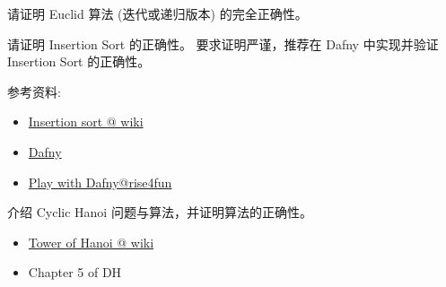 \documentclass[a4paper, justified]{tufte-handout}
\begin{document}
\begin{solution}
\end{solution}

\beginoptional

\begin{problem}
  请证明 Euclid 算法 (迭代或递归版本) 的完全正确性。
\end{problem}

\begin{solution}
\end{solution}

\beginot

\begin{ot}
  请证明 Insertion Sort 的正确性。
  要求证明严谨，推荐在 Dafny 中实现并验证 Insertion Sort 的正确性。

  参考资料:
  \begin{itemize}
    \item \href{https://en.wikipedia.org/wiki/Insertion\_sort}{Insertion sort @ wiki}
    \item \href{https://www.microsoft.com/en-us/research/project/dafny-a-language-and-program-verifier-for-functional-correctness/}{Dafny}
    \item \href{https://rise4fun.com/Dafny}{Play with Dafny@rise4fun}
  \end{itemize}
\end{ot}

\vspace{0.50cm}
\begin{ot}
  介绍 Cyclic Hanoi 问题与算法，并证明算法的正确性。

  \begin{itemize}
    \item \href{https://en.wikipedia.org/wiki/Tower\_of\_Hanoi}{Tower of Hanoi @ wiki}
    \item Chapter 5 of DH
  \end{itemize}
\end{ot}




\beginfb

\end{document}

